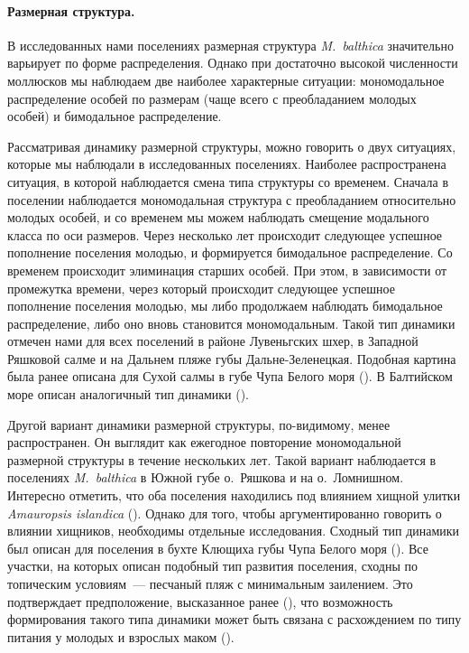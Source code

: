 {%
\paragraph{Размерная структура.}
В исследованных нами поселениях размерная структура \textit{M.~balthica} значительно варьирует по форме распределения.
Однако при достаточно высокой численности моллюсков мы наблюдаем две наиболее характерные ситуации: мономодальное распределение особей по размерам (чаще всего с преобладанием молодых особей) и бимодальное распределение.

Рассматривая динамику размерной структуры, можно говорить о  двух ситуациях, которые мы наблюдали в исследованных поселениях.
Наиболее распространена ситуация, в которой наблюдается смена типа структуры со временем. 
Сначала в поселении наблюдается мономодальная структура с преобладанием относительно молодых особей, и со временем мы можем наблюдать смещение модального класса по оси размеров. 
Через несколько лет происходит следующее успешное пополнение поселения молодью, и формируется бимодальное распределение.
Со временем происходит элиминация старших особей. 
При этом, в зависимости от промежутка времени, через который происходит следующее успешное пополнение поселения молодью, мы либо продолжаем наблюдать бимодальное распределение, либо оно вновь становится мономодальным.
Такой тип динамики отмечен нами для всех поселений в районе Лувеньгских шхер, в Западной Ряшковой салме  и на Дальнем пляже губы Дальне-Зеленецкая.
Подобная картина была ранее описана для Сухой салмы в губе Чупа Белого моря (\cite{Maximovich_et_al_1991}).
В Балтийском море описан аналогичный тип динамики (\cite{Segerstrale_1969}).

Другой вариант динамики размерной структуры, по-видимому, менее распространен.
Он выглядит как ежегодное повторение мономодальной размерной структуры в течение нескольких лет.
Такой вариант наблюдается в поселениях \textit{M.~balthica} в Южной губе о.~Ряшкова и на о.~Ломнишном.
Интересно отметить, что оба поселения находились под влиянием хищной улитки \textit{Amauropsis islandica} (\cite{Aristov_Granovich_2011}).
Однако для того, чтобы аргументированно говорить о влиянии хищников, необходимы отдельные исследования.
Сходный тип динамики был описан для поселения в бухте Клющиха губы Чупа Белого моря (\cite{Maximovich_et_al_1991, Gerasimova_Maximovich_2013}).
Все участки, на которых описан подобный тип развития поселения, сходны по топическим условиям~--- песчаный пляж с минимальным заилением.
Это подтверждает предположение, высказанное ранее (\cite{Gerasimova_Maximovich_2013}), что возможность формирования такого типа динамики может быть связана с расхождением по типу питания у молодых и взрослых маком (\cite{Gerasimova_1988, Olafsson_1989}).


}
